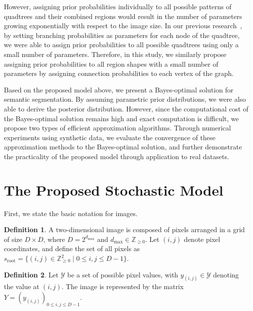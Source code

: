 \documentclass[conference]{IEEEtran}
\theoremstyle{definition}
\newtheorem{defi}{Definition}
\begin{document}
However, assigning prior probabilities individually to all possible patterns of quadtrees and their combined regions would result in the number of parameters growing exponentially with respect to the image size. 
In our previous research~\cite{wang_isita2024}, by setting branching probabilities as parameters for each node of the quadtree, we were able to assign prior probabilities to all possible quadtrees using only a small number of parameters. 
Therefore, in this study, we similarly propose assigning prior probabilities to all region shapes with a small number of parameters by assigning connection probabilities to each vertex of the graph.

Based on the proposed model above, we present a Bayes-optimal solution for semantic segmentation. 
By assuming parametric prior distributions, we were also able to derive the posterior distribution. 
However, since the computational cost of the Bayes-optimal solution remains high and exact computation is difficult, we propose two types of efficient approximation algorithms. 
Through numerical experiments using synthetic data, we evaluate the convergence of these approximation methods to the Bayes-optimal solution, and further demonstrate the practicality of the proposed model through application to real datasets.

\section{The Proposed Stochastic Model}
First, we state the basic notation for images.

\begin{defi}
A two-dimensional image is composed of pixels arranged in a grid of size $D\times D$, where $D = 2^{d_{\mathrm{max}}}$ and $d_{\mathrm{max}} \in \mathbb{Z}_{\geq 0}$. 
Let $(i,j)$ denote pixel coordinates, and define the set of all pixels as $s_{\text{root}} = \{(i,j) \in \mathbb{Z}_{\geq 0}^2 \mid 0 \leq i, j \leq D-1\}$. 
\end{defi}
\begin{defi}
Let $\mathcal{Y}$ be a set of possible pixel values, with $y_{(i,j)} \in \mathcal{Y}$ denoting the value at $(i, j)$. 
The image is represented by the matrix $Y = (y_{(i,j)})_{0 \le i, j \le D-1}$.
\end{defi}
\end{document}
